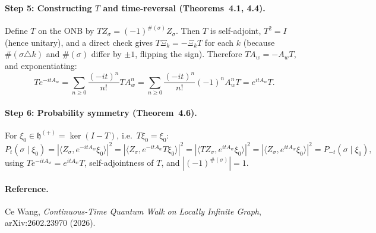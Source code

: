 \documentclass[11pt,a4paper]{article}
\begin{document}
\paragraph{Step 5: Constructing $T$ and time-reversal (Theorems~4.1, 4.4).}
Define $T$ on the ONB by $TZ_\sigma=(-1)^{\#(\sigma)}Z_\sigma$. Then $T$ is self-adjoint, $T^2=I$ (hence unitary), and a direct check gives $T\Xi_k=-\Xi_kT$ for each $k$ (because $\#(\sigma\triangle k)$ and $\#(\sigma)$ differ by $\pm1$, flipping the sign). Therefore $TA_w=-A_wT$, and exponentiating:
\[
  Te^{-itA_w} = \sum_{n\ge 0}\frac{(-it)^n}{n!}TA_w^n
  = \sum_{n\ge 0}\frac{(-it)^n}{n!}(-1)^nA_w^nT = e^{itA_w}T.
\]

\paragraph{Step 6: Probability symmetry (Theorem~4.6).}
For $\xi_0\in\mathfrak{h}^{(+)}=\ker(I-T)$, i.e.\ $T\xi_0=\xi_0$:
\[
  P_t(\sigma\mid\xi_0) = |\langle Z_\sigma,e^{-itA_w}\xi_0\rangle|^2
  = |\langle Z_\sigma,e^{-itA_w}T\xi_0\rangle|^2
  = |\langle TZ_\sigma,e^{itA_w}\xi_0\rangle|^2
  = |\langle Z_\sigma,e^{itA_w}\xi_0\rangle|^2 = P_{-t}(\sigma\mid\xi_0),
\]
using $Te^{-itA_w}=e^{itA_w}T$, self-adjointness of $T$, and $|(-1)^{\#(\sigma)}|=1$.

\vspace{1em}
\noindent\hrulefill

\small
\paragraph{Reference.} Ce Wang, \emph{Continuous-Time Quantum Walk on Locally Infinite Graph}, arXiv:2602.23970 (2026).
\end{document}
